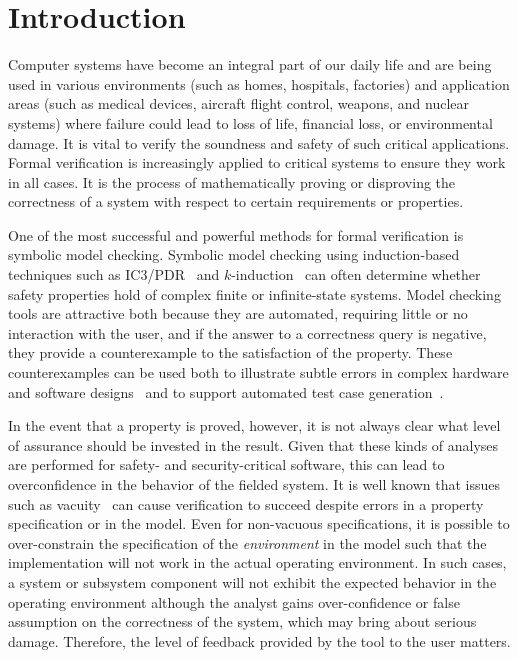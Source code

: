 \chapter{Introduction}
\label{ch:intro}
Computer systems have become an integral part of our daily life and are being used in various environments (such as homes, hospitals, factories) and application areas (such as medical devices, aircraft flight control, weapons, and nuclear systems) where failure could lead to loss of life, financial loss, or environmental damage. It is vital to verify the soundness and safety of such critical applications. Formal verification is increasingly applied to critical systems to ensure they work in all cases. It is the process of mathematically proving or disproving the correctness of a system with respect to certain requirements or properties.

One of the most successful and powerful methods for formal verification is symbolic model checking. Symbolic model checking using induction-based techniques such as IC3/PDR~\cite{Een2011:PDR} and $k$-induction~\cite{SheeranSS00} can often determine whether safety properties hold of complex finite or infinite-state systems.  Model checking tools are attractive both because they are automated, requiring little or no interaction with the user, and if the answer to a correctness query is negative, they provide a counterexample to the satisfaction of the property.  These counterexamples can be used both to illustrate subtle errors in complex hardware and software designs~\cite{hilt2013,McMillan99:compositional, Miller10:CACM} and to support automated test case generation~\cite{Whalen13:OMCDC, You15:dse}.

In the event that a property is proved, however, it is not always clear what level of assurance should be invested in the result.  Given that these kinds of analyses are performed for safety- and security-critical software, this can lead to overconfidence in the behavior of the fielded system.  It is well known that issues such as vacuity~\cite{Kupferman03:Vacuity} can cause verification to succeed despite errors in a property specification or in the model. Even for non-vacuous specifications, it is possible to over-constrain the specification of the {\em environment} in the model such that the implementation will not work in the actual operating environment.
In such cases, a system or subsystem component will not exhibit the expected behavior in the operating environment although the analyst gains over-confidence or false assumption on the correctness of the system, which may bring about serious damage. Therefore, the level of feedback provided by the tool to the user matters.

